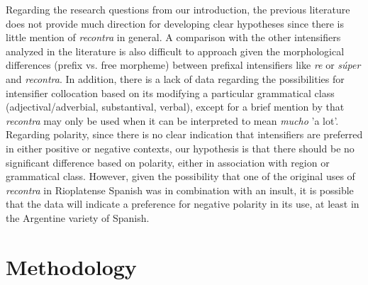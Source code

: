 \documentclass[output=paper,colorlinks,citecolor=brown,
]{langscibook}
\begin{document}
Regarding the research questions from our introduction, the previous literature does not provide much direction for developing clear hypotheses since there is little mention of \textit{recontra} in general. A comparison with the other intensifiers analyzed in the literature is also difficult to approach given the morphological differences (prefix vs. free morpheme) between prefixal intensifiers like \textit{re} or \textit{súper} and \textit{recontra}. In addition, there is a lack of data regarding the possibilities for intensifier collocation based on its modifying a particular grammatical class (adjectival/adverbial, substantival, verbal), except for a brief mention by \citet{kornfeld2012cuantificacion} that \textit{recontra} may only be used when it can be interpreted to mean \textit{mucho} 'a lot'. Regarding polarity, since there is no clear indication that intensifiers are preferred in either positive or negative contexts, our hypothesis is that there should be no significant difference based on polarity, either in association with region or grammatical class. However, given the possibility that one of the original uses of \textit{recontra} in Rioplatense Spanish was in combination with an insult, it is possible that the data will indicate a preference for negative polarity in its use, at least in the Argentine variety of Spanish.

\section{Methodology}
\end{document}
